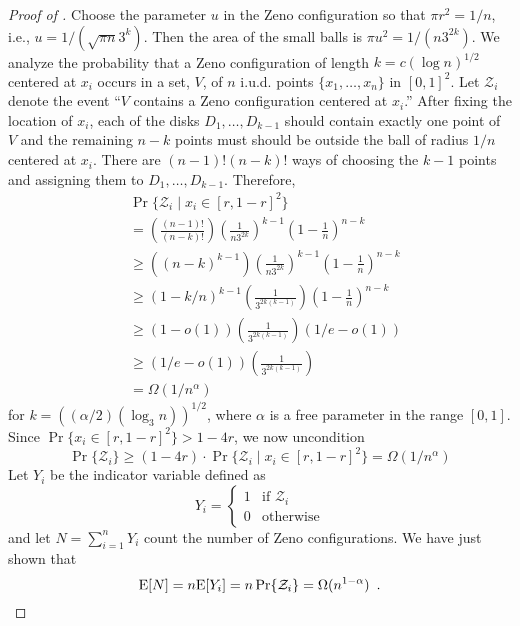 \documentclass{patmorin}
\begin{document}
\begin{proof}[Proof of ]
Choose the parameter $u$ in the Zeno configuration so that $\pi r^2=1/n$,
i.e., $u=1/(\sqrt{\pi n}3^k)$.  Then the area of the small balls is
$\pi u^2=1/(n3^{2k})$.
We analyze the probability that a Zeno configuration of length $k=c(\log
n)^{1/2}$ centered at $x_i$ occurs in a set, $V$, of $n$ i.u.d. points
$\{x_1,\ldots,x_n\}$ in
$[0,1]^2$.  Let $\mathcal{Z}_i$ denote the event ``$V$
contains a Zeno configuration centered at $x_i$.''  
After fixing the location of $x_i$, each of the disks $D_1,\ldots,D_{k-1}$
should contain exactly one point of $V$ and the remaining $n-k$ points
must should be outside the ball of radius $1/n$ centered at $x_i$.
There are $(n-1)!(n-k)!$ ways of choosing the $k-1$ points and assigning them to $D_1,\ldots,D_{k-1}$.  Therefore,
\begin{align*}
 &\!\!\!\! \Pr\{\mathcal{Z}_i\mid x_i\in[r,1-r]^2\} \\
  & = \left(\frac{(n-1)!}{(n-k)!}\right) %
      \left(\frac{1}{n3^{2k}}\right)^{k-1}   %
      \left(1-\frac{1}{n}\right)^{n-k}   \\ %
  & \ge
      \left((n-k)^{k-1}\right) 
      \left(\frac{1}{n3^{2k}}\right)^{k-1}  
      \left(1-\frac{1}{n}\right)^{n-k}   \\ 
  & \ge 
      (1-k/n)^{k-1} %
      \left(\frac{1}{3^{2k(k-1)}}\right)
      \left(1-\frac{1}{n}\right)^{n-k} \\
  & \ge
      \left(1-o(1)\right) 
      \left(\frac{1}{3^{2k(k-1)}}\right)
      \left(1/e-o(1)\right)   \\ 
  & \ge (1/e-o(1)) \left(\frac{1}{3^{2k(k-1)}}\right) \\
  & = \Omega(1/n^{\alpha})
\end{align*}
for $k=((\alpha/2)(\log_3 n))^{1/2}$, where $\alpha$ is a free parameter
in the range $[0,1]$.  Since $\Pr\{x_i\in[r,1-r]^2\} > 1-4r$, we now
uncondition
\[
 \Pr\{\mathcal{Z}_i\} \ge  
    (1-4r)\cdot\Pr\{\mathcal{Z}_i\mid x_i\in[r,1-r]^2\}
    = \Omega(1/n^{\alpha})
\]
Let $Y_i$ be the indicator variable defined as
\[
   Y_i = \begin{cases} 1 & \text{if $\mathcal{Z}_i$} \\
                       0 & \text{otherwise} 
         \end{cases}
\]
and let $N=\sum_{i=1}^n Y_i$ count the number of Zeno configurations.  We
have just shown that 
\[
   \mathrm{E}[N] = n\mathrm{E}[Y_i] = n\Pr\{\mathcal{Z}_i\}=\Omega(n^{1-\alpha}) \enspace .
\]
\end{proof}
\end{document}
